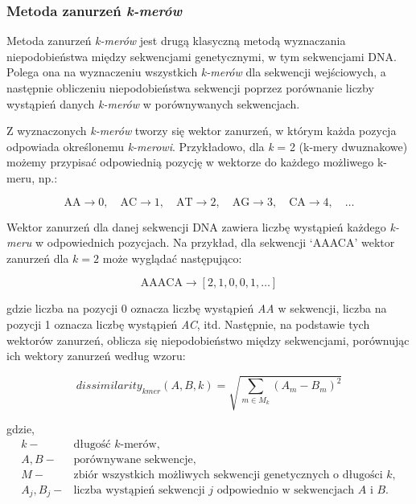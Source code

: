         \subsubsection{Metoda zanurzeń \textit{k-merów}}
            Metoda zanurzeń \textit{k-merów} jest drugą klasyczną metodą wyznaczania niepodobieństwa między sekwencjami genetycznymi, w tym sekwencjami DNA. Polega ona na wyznaczeniu wszystkich \textit{k-merów} dla sekwencji wejściowych, a następnie obliczeniu niepodobieństwa sekwencji poprzez porównanie liczby wystąpień danych \textit{k-merów} w porównywanych sekwencjach.

            Z wyznaczonych \textit{k-merów} tworzy się wektor zanurzeń, w którym każda pozycja odpowiada określonemu \textit{k-merowi}. Przykładowo, dla \textit{k} = 2 (k-mery dwuznakowe) możemy przypisać odpowiednią pozycję w wektorze do każdego możliwego k-meru, np.:
            
            \[
            \text{AA} \to 0, \quad \text{AC} \to 1, \quad \text{AT} \to 2, \quad \text{AG} \to 3, \quad \text{CA} \to 4, \quad \dots
          \]

            
            Wektor zanurzeń dla danej sekwencji DNA zawiera liczbę wystąpień każdego \textit{k-meru} w odpowiednich pozycjach. Na przykład, dla sekwencji `AAACA' wektor zanurzeń dla $k=2$ może wyglądać następująco:
            
            \[
            \text{AAACA} \to [2, 1, 0, 0, 1, \dots]
          \]

            
            gdzie liczba na pozycji 0 oznacza liczbę wystąpień \textit{AA} w sekwencji, liczba na pozycji 1 oznacza liczbę wystąpień \textit{AC}, itd. Następnie, na podstawie tych wektorów zanurzeń, oblicza się niepodobieństwo między sekwencjami, porównując ich wektory zanurzeń według wzoru:

            \begin{equation}
                dissimilarity_{kmer}(A, B, k) = \sqrt{\sum_{m \in M_{k}} (A_m - B_m)^{2}}
            \end{equation}

            gdzie,
            \begin{align*} 
                k -& \text{długość $k$-merów}, \\
                A, B -& \text{porównywane sekwencje}, \\
                M -& \text{zbiór wszystkich możliwych sekwencji genetycznych o długości $k$}, \\
                A_j, B_j -& \text{liczba wystąpień sekwencji } j \text{ odpowiednio w sekwencjach } A \text{ i } B. \\
            \end{align*}

